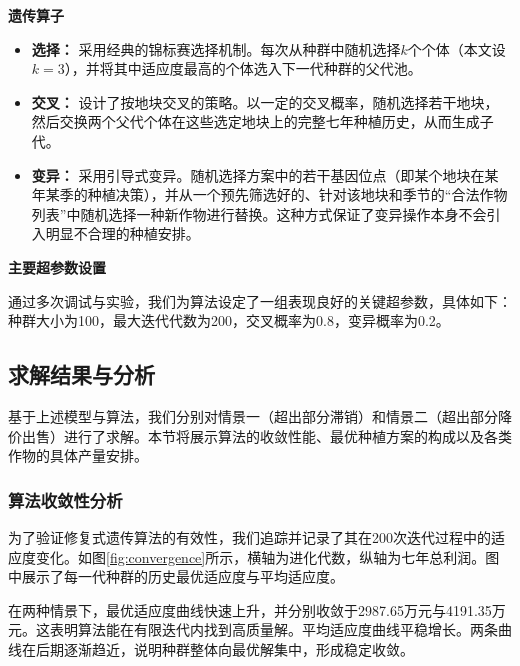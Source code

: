 \textbf{遗传算子}

\begin{itemize}
	\item \textbf{选择：} 采用经典的锦标赛选择机制。每次从种群中随机选择$k$个个体（本文设$k=3$），并将其中适应度最高的个体选入下一代种群的父代池。
	\item \textbf{交叉：} 设计了按地块交叉的策略。以一定的交叉概率，随机选择若干地块，然后交换两个父代个体在这些选定地块上的完整七年种植历史，从而生成子代。
	\item \textbf{变异：} 采用引导式变异。随机选择方案中的若干基因位点（即某个地块在某年某季的种植决策），并从一个预先筛选好的、针对该地块和季节的“合法作物列表”中随机选择一种新作物进行替换。这种方式保证了变异操作本身不会引入明显不合理的种植安排。
\end{itemize}

\textbf{主要超参数设置}

通过多次调试与实验，我们为算法设定了一组表现良好的关键超参数，具体如下：种群大小为100，最大迭代代数为200，交叉概率为0.8，变异概率为0.2。

\vspace{1cm}

\subsection{求解结果与分析}

基于上述模型与算法，我们分别对情景一（超出部分滞销）和情景二（超出部分降价出售）进行了求解。本节将展示算法的收敛性能、最优种植方案的构成以及各类作物的具体产量安排。

\subsubsection{算法收敛性分析}


为了验证修复式遗传算法的有效性，我们追踪并记录了其在200次迭代过程中的适应度变化。如图\ref{fig:convergence}所示，横轴为进化代数，纵轴为七年总利润。图中展示了每一代种群的历史最优适应度与平均适应度。

在两种情景下，最优适应度曲线快速上升，并分别收敛于2987.65万元与4191.35万元。这表明算法能在有限迭代内找到高质量解。平均适应度曲线平稳增长。两条曲线在后期逐渐趋近，说明种群整体向最优解集中，形成稳定收敛。

